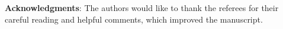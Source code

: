 \documentclass[11pt,oneside,reqno]{amsart}
\numberwithin{equation}{section}
\begin{document}
%

\bigskip 

{\bf Acknowledgments}:  The authors would like to thank the referees for their careful reading and helpful
comments, which improved the manuscript.
\end{document}
